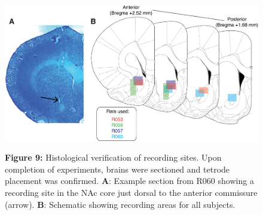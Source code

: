 \documentclass[11pt]{article}
\newcommand{\bsf}[1]{\textbf{#1}}
\providecommand{\DIFdel}[1]{} %
\providecommand{\DIFdelFL}[1]{\DIFdel{#1}} %
\providecommand{\DIFaddbeginFL}{} %
\providecommand{\DIFaddendFL}{} %
\providecommand{\DIFdelbeginFL}{} %
\providecommand{\DIFdelendFL}{} %
\newcommand{\DIFscaledelfig}{0.5}
\newlength{\DIFdelgraphicswidth} %
\newlength{\DIFdelgraphicsheight} %
\newcommand{\DIFaddincludegraphics}[2][]{{\color{red}\fbox{\DIFOincludegraphics[#1]{#2}}}} %
\newcommand{\DIFdelincludegraphics}[2][]{%
\sbox{\DIFdelgraphicsbox}{\DIFOincludegraphics[#1]{#2}}%
\settoboxwidth{\DIFdelgraphicswidth}{\DIFdelgraphicsbox} %
\settoboxtotalheight{\DIFdelgraphicsheight}{\DIFdelgraphicsbox} %
\scalebox{\DIFscaledelfig}{%
\parbox[b]{\DIFdelgraphicswidth}{\usebox{\DIFdelgraphicsbox}\\[-\baselineskip] \rule{\DIFdelgraphicswidth}{0em}}\llap{\resizebox{\DIFdelgraphicswidth}{\DIFdelgraphicsheight}{%
\setlength{\unitlength}{\DIFdelgraphicswidth}%
\begin{picture}(1,1)%
\thicklines\linethickness{2pt} %
{\color[rgb]{1,0,0}\put(0,0){\framebox(1,1){}}}%
{\color[rgb]{1,0,0}\put(0,0){\line( 1,1){1}}}%
{\color[rgb]{1,0,0}\put(0,1){\line(1,-1){1}}}%
\end{picture}%
}\hspace*{3pt}}} %
} %
\DeclareRobustCommand{\DIFaddbeginFL}{\DIFOaddbeginFL \let\includegraphics\DIFaddincludegraphics} %
\DeclareRobustCommand{\DIFaddendFL}{\DIFOaddendFL \let\includegraphics\DIFOincludegraphics} %
\DeclareRobustCommand{\DIFdelbeginFL}{\DIFOdelbeginFL \let\includegraphics\DIFdelincludegraphics} %
\DeclareRobustCommand{\DIFdelendFL}{\DIFOaddendFL \let\includegraphics\DIFOincludegraphics} %
\begin{document}
 \begin{figure}[ht!]
\centering
\DIFdelbeginFL %
{%
\DIFdelFL{Histological verification of recording sites. Upon completion of
  experiments, brains were sectioned and tetrode placement was
  confirmed. \bsf{A}: Example section from R060 showing a recording site in the
  NAc core just dorsal to the anterior commissure (arrow). \bsf{B}:
  Schematic showing recording areas for all subjects.}}
\DIFdelendFL \DIFaddbeginFL \includegraphics[width=\textwidth]{Fig 9 - Histology.png}
\caption*{\bsf{Figure 9:} Histological verification of recording sites. Upon completion of
  experiments, brains were sectioned and tetrode placement was
  confirmed. \bsf{A}: Example section from R060 showing a recording site in the
  NAc core just dorsal to the anterior commissure (arrow). \bsf{B}:
  Schematic showing recording areas for all subjects.}
\DIFaddendFL \label{fig:histo}
\end{figure} \clearpage


\end{document}

